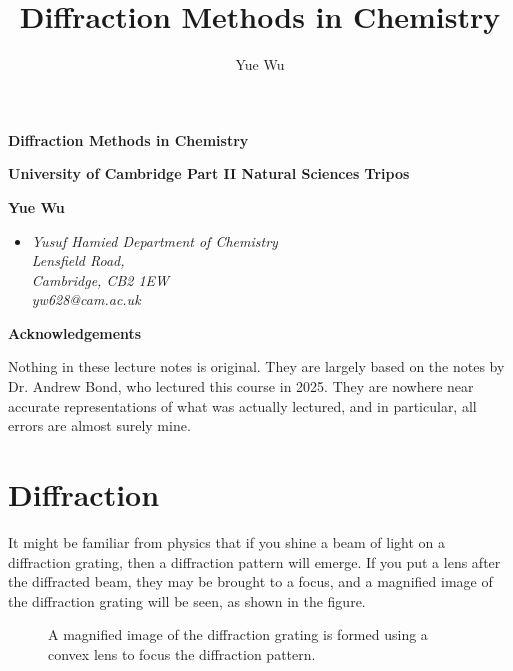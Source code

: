 \documentclass{article}
\title{Diffraction Methods in Chemistry}
\author{Yue Wu}
\theoremstyle{plain}\theoremheaderfont{\normalfont\itshape}\theorembodyfont{\rmfamily}\theoremseparator{.}\newtheorem*{rem}{Remark}\newtheorem*{ex}{Example}\newtheorem*{proof}{Proof}\newtheorem*{altp}{Alternative proof}
\theoremstyle{plain}\theoremheaderfont{\normalfont\bfseries}\theorembodyfont{\rmfamily}\theoremseparator{.}\newtheorem{thm}{Theorem}[section]\newtheorem{lem}[thm]{Lemma}\newtheorem{prop}[thm]{Proposition}\newtheorem*{cor}{Corollary}\newtheorem{defn}[thm]{Definition}\newtheorem{clm}[thm]{Claim}\newtheorem{clminproof}{Claim}\newtheorem*{law}{Law}\newtheorem{pos}[thm]{Postulate}
\theoremstyle{break}\theoremheaderfont{\normalfont\itshape}\theorembodyfont{\rmfamily}\theoremseparator{.\medskip}\newtheorem*{proofskip}{Proof}\newtheorem*{exs}{Examples}\newtheorem*{rems}{Remarks}
\theoremstyle{break}\theoremheaderfont{\normalfont\bfseries}\theorembodyfont{\rmfamily}\theoremseparator{.\medskip}\newtheorem{lemskip}[thm]{Lemma}\newtheorem{defnskip}[thm]{Definition}\newtheorem{propskip}[thm]{Proposition}\newtheorem{thmskip}[thm]{Theorem}
\numberwithin{equation}{section}
\begin{document}
    \setlength{\parindent}{0pt}
	\Huge\textsf{\textbf{Diffraction Methods in Chemistry}}
		
	\Large\textsf{\textbf{University of Cambridge Part II Natural Sciences Tripos}}

	\noindent\makebox[\linewidth]{\rule{\textwidth}{2pt}}

	\large\textsf{\textbf{Yue Wu}}
	\begin{itemize}[topsep=0pt,leftmargin=15pt]
		\item[] \textit{Yusuf Hamied Department of Chemistry\\
		Lensfield Road,\\
		Cambridge, CB2 1EW}\\

		\textit{yw628@cam.ac.uk}
	\end{itemize}
    \thispagestyle{empty}
    \setlength{\parindent}{15pt}

    \newpage
    \begin{center}
		\textbf{\Large{Acknowledgements}}
	\end{center}
	\large
	Nothing in these lecture notes is original. They are largely based on the notes by Dr. Andrew Bond, who lectured this course in 2025. They are nowhere near accurate representations of what was actually lectured, and in particular, all errors are almost surely mine.

    \normalsize
    \newpage
	\tableofcontents
	\newpage

    \section{Diffraction}
    It might be familiar from physics that if you shine a beam of light on a diffraction grating, then a diffraction pattern will emerge. If you put a lens after the diffracted beam, they may be brought to a focus, and a magnified image of the diffraction grating will be seen, as shown in the figure.

    \begin{figure}
        \centering
        \caption{A magnified image of the diffraction grating is formed using a convex lens to focus the diffraction pattern.}
    \end{figure}
\end{document}
